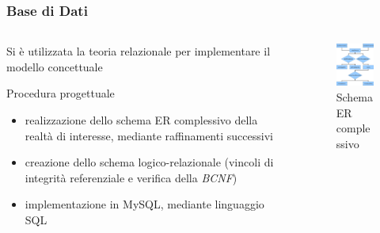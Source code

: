 \begin{frame}
\frametitle{Base di Dati}
\begin{columns}[c]
\begin{column}{5.5cm}
\begin{block}{}
Si è utilizzata la teoria relazionale per implementare il
modello concettuale
\end{block}
\begin{block}{Procedura progettuale}

\begin{itemize}
\item realizzazione dello schema ER complessivo della realtà
di interesse, mediante raffinamenti successivi
\item 
creazione dello schema  logico-relazionale 
(vincoli di integrità referenziale e verifica della \emph{BCNF})
\item implementazione in MySQL\cpr{}, mediante linguaggio SQL
\end{itemize}

\end{block}
\end{column}

\begin{column}{4.5cm}
\begin{figure}[htbp]
\begin{center}
\includegraphics[width=3.5cm]{image/SchemaERcompleto.pdf}
	\caption {Schema ER complessivo}
	\label{schemaER}
\end{center}
\end{figure}
\end{column}
\end{columns}
\end{frame}

